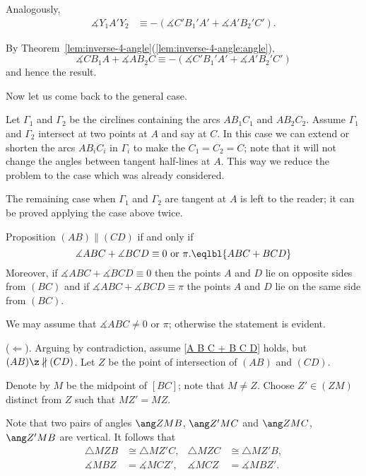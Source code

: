 {Analogously,
\begin{align*}
\measuredangle Y_1A'Y_2&
\equiv -(\measuredangle C'B_1'A'+\measuredangle A'B_2' C').
\end{align*}

By Theorem~\ref{lem:inverse-4-angle}(\ref{lem:inverse-4-angle:angle}), 
\[\measuredangle CB_1A+\measuredangle AB_2 C
\equiv
-(\measuredangle C'B_1'A'+\measuredangle A'B_2' C')
\]
and hence the result.

Now let us come back to the general case.

Let $\Gamma_1$ and $\Gamma_2$ be the circlines containing the arcs $AB_1C_1$ and $AB_2C_2$.
Assume $\Gamma_1$ and $\Gamma_2$ intersect at two points at $A$ and say at $C$.
In this case we can extend or shorten the arcs  $AB_iC_i$ in $\Gamma_i$ to make the $C_1=C_2=C$;
note that it will not change the angles between tangent half-lines at $A$.
This way we reduce the problem to the case which was already considered.

The remaining case when $\Gamma_1$ and $\Gamma_2$ are tangent at $A$ is left to the reader;
it can be proved applying the case above twice.
\qeds













\begin{thm}{Proposition}\label{prop:parallel-2}
$(AB)\parallel(C D)$ if and only if 
$$\measuredangle A B C+\measuredangle B C D\equiv 0\ \text{or}\ \pi.\eqlbl{A B C + B C D}$$ 
Moreover, if $\measuredangle A B C+\measuredangle B C D\equiv 0$
then the points $A$ and $D$ lie on opposite sides from $(BC)$ 
and if $\measuredangle A B C+\measuredangle B C D\equiv \pi$
 the points $A$ and $D$ lie on the same side from $(BC)$.
\end{thm}

We may assume that $\measuredangle ABC\ne 0$ or $\pi$;
otherwise the statement is evident. 

\parit{}($\Leftarrow$).
Arguing by contradiction, 
assume \ref{A B C + B C D} holds, but $(AB)\z\nparallel(C D)$.
Let $Z$ be the point of intersection of $(AB)$ and $(CD)$.

Denote by $M$ be the midpoint of $[BC]$; note that $M\ne Z$.
Choose $Z'\in (ZM)$ distinct from $Z$ such that $MZ'=MZ$.

Note that two pairs of angles 
$\ang ZMB$, $\ang Z'MC$
and
$\ang ZMC$, $\ang Z'MB$
are vertical.
It follows that
\begin{align*}
\triangle MZB&\cong \triangle MZ'C,
& 
\triangle MZC&\cong \triangle MZ'B,
\\
\measuredangle MBZ&=\measuredangle MCZ',
&
\measuredangle MCZ&=\measuredangle MBZ'.
\end{align*}

}
